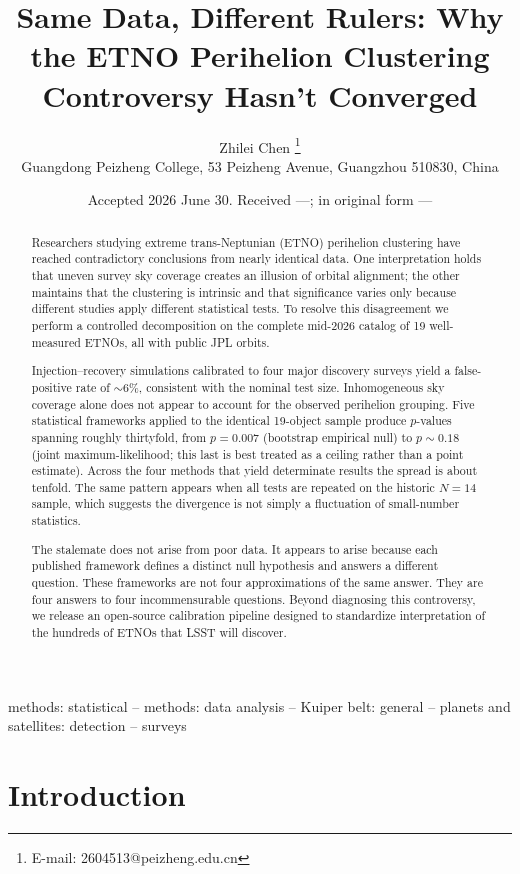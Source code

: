 \documentclass[usenatbib]{mnras}
\title{Same Data, Different Rulers: Why the ETNO Perihelion Clustering Controversy Hasn't Converged}
\author[Zhilei Chen]{Zhilei Chen%
\thanks{E-mail: 2604513@peizheng.edu.cn}%
\\
Guangdong Peizheng College, 53 Peizheng Avenue, Guangzhou 510830, China}
\date{Accepted 2026 June 30. Received ---; in original form ---}
\begin{document}
\maketitle

\begin{abstract}
Researchers studying extreme trans-Neptunian (ETNO) perihelion clustering have reached contradictory conclusions from nearly identical data. One interpretation holds that uneven survey sky coverage creates an illusion of orbital alignment; the other maintains that the clustering is intrinsic and that significance varies only because different studies apply different statistical tests. To resolve this disagreement we perform a controlled decomposition on the complete mid-2026 catalog of 19 well-measured ETNOs, all with public JPL orbits.

Injection--recovery simulations calibrated to four major discovery surveys yield a false-positive rate of $\sim$6\%, consistent with the nominal test size. Inhomogeneous sky coverage alone does not appear to account for the observed perihelion grouping. Five statistical frameworks applied to the identical 19-object sample produce $p$-values spanning roughly thirtyfold, from $p=0.007$ (bootstrap empirical null) to $p\sim0.18$ (joint maximum-likelihood; this last is best treated as a ceiling rather than a point estimate). Across the four methods that yield determinate results the spread is about tenfold. The same pattern appears when all tests are repeated on the historic $N=14$ sample, which suggests the divergence is not simply a fluctuation of small-number statistics.

The stalemate does not arise from poor data. It appears to arise because each published framework defines a distinct null hypothesis and answers a different question. These frameworks are not four approximations of the same answer. They are four answers to four incommensurable questions. Beyond diagnosing this controversy, we release an open-source calibration pipeline designed to standardize interpretation of the hundreds of ETNOs that LSST will discover.
\end{abstract}

\begin{keywords}
methods: statistical -- methods: data analysis -- Kuiper belt: general -- planets and satellites: detection -- surveys
\end{keywords}

\section{Introduction}
\end{document}
